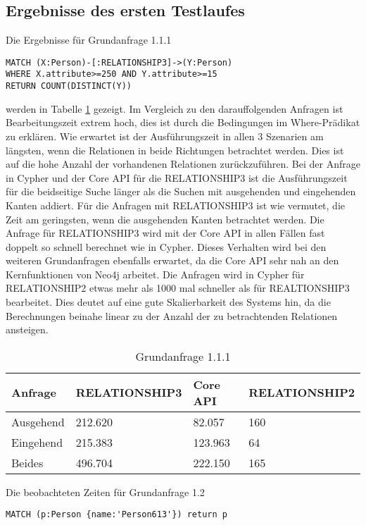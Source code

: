 \subsection{Ergebnisse des ersten Testlaufes}
Die Ergebnisse für Grundanfrage 1.1.1
\begin{Verbatim}[frame=single]
MATCH (X:Person)-[:RELATIONSHIP3]->(Y:Person) 
WHERE X.attribute>=250 AND Y.attribute>=15  
RETURN COUNT(DISTINCT(Y))
\end{Verbatim} 
 werden  in Tabelle \ref{tab:Query1_1} gezeigt. Im Vergleich zu den darauffolgenden Anfragen ist Bearbeitungszeit extrem hoch, dies ist durch die Bedingungen im Where-Prädikat zu erklären. Wie erwartet ist der Ausführungszeit in allen 3 Szenarien am längsten, wenn die Relationen in beide Richtungen betrachtet werden. Dies ist auf die hohe Anzahl der vorhandenen Relationen zurückzuführen. Bei der Anfrage in Cypher und der Core API für die RELATIONSHIP3  ist die Ausführungszeit für die beidseitige Suche länger als die Suchen mit ausgehenden und eingehenden Kanten addiert. Für die Anfragen mit RELATIONSHIP3 ist wie vermutet, die Zeit am geringsten, wenn die ausgehenden Kanten betrachtet werden. \newline
Die Anfrage für RELATIONSHIP3 wird mit der Core API in  allen Fällen fast doppelt so schnell berechnet wie in Cypher. Dieses Verhalten wird bei den weiteren Grundanfragen ebenfalls erwartet, da die Core API sehr nah an den Kernfunktionen von Neo4j arbeitet. \newline
Die Anfragen wird in Cypher für RELATIONSHIP2 etwas mehr als 1000 mal schneller als für REALTIONSHIP3 bearbeitet. Dies deutet auf eine gute Skalierbarkeit des Systems hin, da die Berechnungen beinahe linear zu der Anzahl der zu betrachtenden Relationen ansteigen. 
\FloatBarrier  
\begin{table}[h]
\centering
\begin{tabular}{ |p{3cm}||p{3cm}|p{3cm}|p{3cm}|  }
	\hline
	Anfrage& RELATIONSHIP3 &Core API&RELATIONSHIP2\\
	\hline
	Ausgehend	& 212.620  & 82.057   & 160\\
	Eingehend   & 215.383    &123.963&  64\\
	Beides&496.704 & 222.150&  165\\
	\hline
\end{tabular}
\caption{Grundanfrage 1.1.1}
\label{tab:Query1_1}
\end{table}
\FloatBarrier
 \noindent Die beobachteten Zeiten für Grundanfrage 1.2
 \begin{Verbatim}[frame=single]
 MATCH (p:Person {name:'Person613'}) return p
 \end{Verbatim} 
